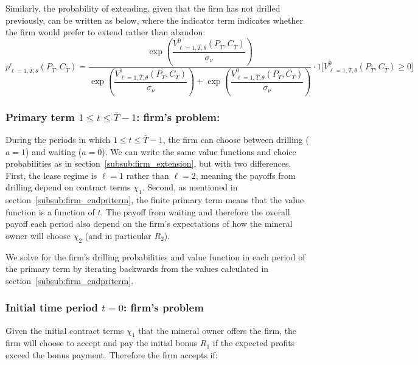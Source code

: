 \documentclass[12pt]{article}
\begin{document}
Similarly, the probability of extending, given that the firm has not drilled previously, can be written as below, where the indicator term indicates whether the firm would prefer to extend rather than abandon:
\begin{equation}
p^e_{\ell=1,\bar{T},\theta}(P_{\bar{T}},C_{\bar{T}}) =
\dfrac{ \exp \left( \dfrac{V^0_{\ell=1,\bar{T},\theta}(P_{\bar{T}},C_{\bar{T}})}{\sigma_{\nu}} \right) }{ \exp \left( \dfrac{V^1_{\ell=1,\bar{T},\theta}(P_{\bar{T}},C_{\bar{T}})}{\sigma_{\nu}} \right) + \exp \left( \dfrac{V^0_{\ell=1,\bar{T},\theta}(P_{\bar{T}},C_{\bar{T}})}{\sigma_{\nu}} \right)  }  \cdot 1\bigg[ V^0_{\ell=1,\bar{T},\theta}(P_{\bar{T}},C_{\bar{T}}) \geq 0 \bigg]
\end{equation}




\subsubsection{Primary term $1 \leq t \leq \bar{T} - 1$: firm's problem:}

During the periods in which $1 \leq t \leq \bar{T} - 1$, the firm can choose between drilling ($a=1$) and waiting ($a=0$). We can write the same value functions and choice probabilities as in section~\ref{subsub:firm_extension}, but with two differences. First, the lease regime is $\ell=1$ rather than $\ell=2$, meaning the payoffs from drilling depend on contract terms $\chi_1$.  Second, as mentioned in section~\ref{subsub:firm_endpriterm}, the finite primary term means that the value function is a function of $t$. The payoff from waiting and therefore the overall payoff each period also depend on the firm's expectations of how the mineral owner will choose $\chi_2$ (and in particular $R_2$).

We solve for the firm's drilling probabilities and value function in each period of the primary term by iterating backwards from the values calculated in section~\ref{subsub:firm_endpriterm}.


\subsubsection{Initial time period $t = 0$: firm's problem}

Given the initial contract terms $\chi_1$ that the mineral owner offers the firm, the firm will choose to accept and pay the initial bonus $R_1$ if the expected profits exceed the bonus payment. Therefore the firm accepts if:
\end{document}
